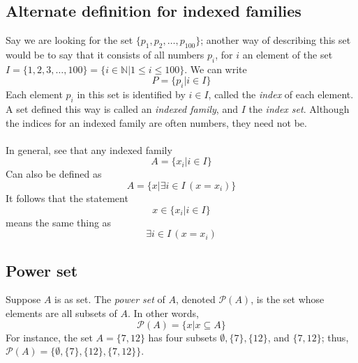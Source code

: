 \documentclass{report}
\begin{document}
\subsection{Alternate definition for indexed families}
Say we are looking for the set $\{p_1,p_2,\ldots,p_{100}\}$; another way of describing this set would be to say that it consists of all numbers $p_i$, for $i$ an element of the set
$I=\{1,2,3,\ldots,100\}=\{i\in\mathbb{N}|1\leq i\leq 100\}$. We can write
\begin{equation*}
P=\{p_i|i\in I\}
\end{equation*}
Each element $p_i$ in this set is identified by $i\in I$, called the \textit{index} of each element. A set defined this way is called an \textit{indexed family}, and $I$ the \textit{index set}.
Although the indices for an indexed family are often numbers, they need not be.\\
\vspace{1mm}\\
In general, see that any indexed family
\begin{equation*}
A=\{x_i|i\in I\}
\end{equation*}
Can also be defined as
\begin{equation*}
A=\{x|\exists i\in I\,(x=x_i)\}
\end{equation*}
It follows that the statement
\begin{equation*}
x\in\{x_i|i\in I\}
\end{equation*}
means the same thing as
\begin{equation*}
\exists i\in I\,(x=x_i)
\end{equation*}
\newpage

\subsection{Power set}
Suppose $A$ is as set. The \textit{power set} of $A$, denoted $\mathscr{P}(A)$, is the set whose elements are all subsets of $A$. In other words,
\begin{equation*}
\mathscr{P}(A)=\{x|x\subseteq A\}
\end{equation*}
For instance, the set $A=\{7,12\}$ has four subsets $\emptyset,\{7\},\{12\}$, and $\{7,12\}$;
thus, $\mathscr{P}(A)=\{\emptyset,\{7\},\{12\},\{7,12\}\}$. 
\end{document}
